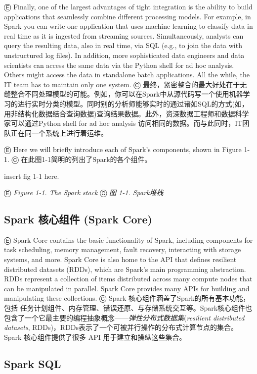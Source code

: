 Ⓔ Finally, one of the largest advantages of tight integration is the
ability to build applications that seamlessly combine different
processing models. For example, in Spark you can write one application
that uses machine learning to classify data in real time as it is
ingested from streaming sources. Simultaneously, analysts can query the
resulting data, also in real time, via SQL (e.g., to join the data with
unstructured log files). In addition, more sophisticated data engineers
and data scientists can access the same data via the Python shell for ad
hoc analysis. Others might access the data in standalone batch
applications. All the while, the IT team has to maintain only one
system. Ⓒ
最终，紧密整合的最大好处在于无缝整合不同处理模型的可能。例如，你可以在Spark中从源代码写一个使用机器学习的进行实时分类的模型。同时别的分析师能够实时的通过诸如SQL的方式(如，用非结构化数据结合查询数据)查询结果数据。此外，资深数据工程师和数据科学家可以通过Python
shell for ad hoc analysis
访问相同的数据。而与此同时，IT团队正在同一个系统上进行着运维。

Ⓔ Here we will briefly introduce each of Spark's components, shown in
Figure 1-1. Ⓒ 在此图1-1简明的列出了Spark的各个组件。

insert fig 1-1 here.

Ⓔ \emph{Figure 1-1. The Spark stack} Ⓒ \emph{图 1-1. Spark堆栈}

\subsection{Spark 核心组件 (Spark
Core)}\label{spark-ux6838ux5fc3ux7ec4ux4ef6-spark-core}

Ⓔ Spark Core contains the basic functionality of Spark, including
components for task scheduling, memory management, fault recovery,
interacting with storage systems, and more. Spark Core is also home to
the API that defines resilient distributed datasets (RDDs), which are
Spark's main programming abstraction. RDDs represent a collection of
items distributed across many compute nodes that can be manipulated in
parallel. Spark Core provides many APIs for building and manipulating
these collections. Ⓒ Spark 核心组件涵盖了Spark的所有基本功能，包括
任务计划组件、内存管理、错误还原、与存储系统交互等。Spark核心组件也包含了一个它最主要的编程抽象概念------\emph{弹性分布式数据集}(\emph{resilient
distributed datasets},
RDDs)，RDDs表示了一个可被并行操作的分布式计算节点的集合。Spark
核心组件提供了很多 API 用于建立和操纵这些集合。

\subsection{Spark SQL}\label{spark-sql}

